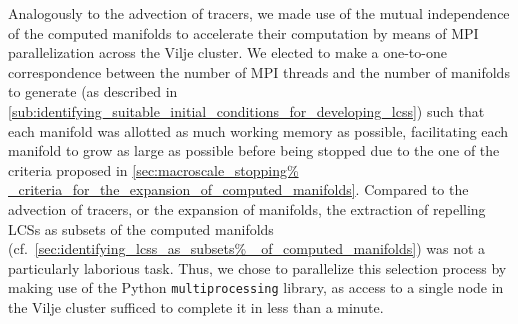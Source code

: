 Analogously to the advection of tracers, we made use of the mutual independence
of the computed manifolds to accelerate their computation by means of MPI
parallelization across the Vilje cluster. We elected to make a one-to-one
correspondence between the number of MPI threads and the number of manifolds to
generate (as described in
\cref{sub:identifying_suitable_initial_conditions_for_developing_lcss}) such
that each manifold was allotted as much working memory as possible,
facilitating each manifold to grow as large as possible before being stopped
due to the one of the criteria proposed in \cref{sec:macroscale_stopping%
_criteria_for_the_expansion_of_computed_manifolds}. Compared to the advection
of tracers, or the expansion of manifolds, the extraction of repelling LCSs as
subsets of the computed manifolds (cf.\ \cref{sec:identifying_lcss_as_subsets%
_of_computed_manifolds}) was not a particularly laborious task. Thus, we chose
to parallelize this selection process by making use of the Python
\texttt{multiprocessing} library, as access to a single node in the Vilje
cluster sufficed to complete it in less than a minute.
